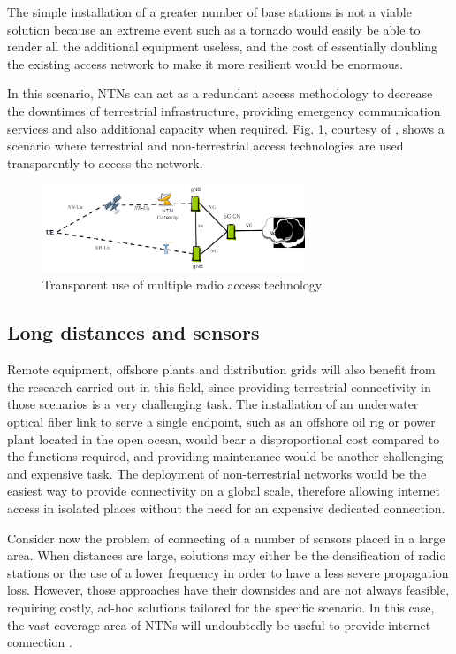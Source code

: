 The simple installation of a greater number of base stations is not a viable solution because an extreme event such as a tornado would easily be able to render all the additional equipment useless, and the cost of essentially doubling the existing access network to make it more resilient would be enormous.

In this scenario, \ac{NTNs} can act as a redundant access methodology to decrease the downtimes of terrestrial infrastructure, providing emergency communication services and also additional capacity when required. 
Fig. \ref{fig:multiple-connectivity}, courtesy of \cite{3gpp-tr-38.811}, shows a scenario where terrestrial and non-terrestrial access technologies are used transparently to access the network. 

\begin{figure}[ht]
    \centering
    \includegraphics[width=0.7\textwidth]{res/multiple-connectivity.png}
    \caption{Transparent use of multiple radio access technology \cite{3gpp-tr-38.811}}
    \label{fig:multiple-connectivity}
\end{figure}

\subsection{Long distances and sensors}
Remote equipment, offshore plants and distribution grids will also benefit from the research carried out in this field, since providing terrestrial connectivity in those scenarios is a very challenging task. The installation of an underwater optical fiber link to serve a single endpoint, such as an offshore oil rig or power plant located in the open ocean, would bear a disproportional cost compared to the functions required, and providing maintenance would be another challenging and expensive task. 
The deployment of non-terrestrial networks would be the easiest way to provide connectivity on a global scale, therefore allowing internet access in isolated places without the need for an expensive dedicated connection.

Consider now the problem of connecting of a number of sensors placed in a large area. When distances are large, solutions may either be the densification of radio stations or the use of a lower frequency in order to have a less severe propagation loss. However, those approaches have their downsides and are not always feasible, requiring costly, ad-hoc solutions tailored for the specific scenario. In this case, the vast coverage area of \ac{NTNs} will undoubtedly be useful to provide internet connection \cite{performance-ntn-support-iot-wang}.

